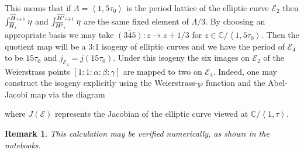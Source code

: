 \documentclass{amsart}
\newtheorem{remark}[theorem]{Remark}
\newcommand{\pangle}[1]{\left\langle #1 \right\rangle}
\begin{document}
This means that if $\Lambda=\pangle{1, 5 \tau_0}$ is the period lattice of the elliptic curve
$\mathcal{E}_2$ then $\int_{\overline{H}_i}\sp{\overline{H}_{i+1}}\eta$
and
 $\int_{\overline{H'}_i}\sp{\overline{H'}_{i+1}}\eta$
are the same fixed element of $\Lambda/3$. By choosing an appropriate basis we
may take $\overline{(345)} : z \to z+1/3$ for $z\in\mathbb{C}/\pangle{1, 5 \tau_0}$. Then
the quotient map will be a 3:1 isogeny of elliptic curves and we 
have the period of $\mathcal{E}_4$ to be $15 \tau_0$ and $j_{\mathcal{E}_4} = j(15 \tau_0)$.
Under this isogeny the six images on $\mathcal{E}_2$ of the Weierstrass points $[1:1:\alpha:\beta:\gamma]$ are mapped to two on $\mathcal{E}_4$.
Indeed, one may construct the isogeny explicitly using the Weierstrass-$\wp$ function and the Abel-Jacobi map via the diagram 
\begin{center}
\end{center} 
where $J(\mathcal{E})$ represents the Jacobian of the elliptic curve viewed at $\mathbb{C}/\pangle{1,\tau}$. 


\begin{remark}
This calculation may be verified numerically, as shown in the notebooks.
\end{remark}
\end{document}
